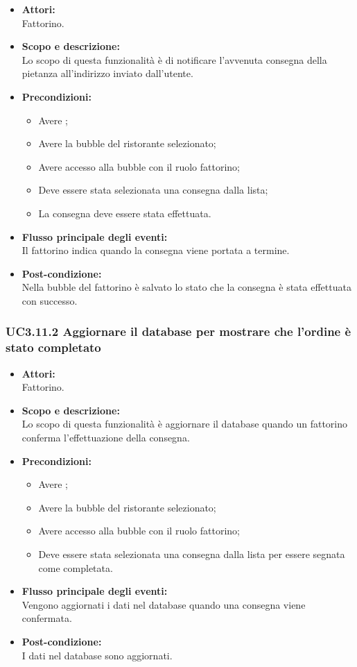 \begin{itemize}
	\item \textbf{Attori:}
	\\Fattorino.
	\item \textbf{Scopo e descrizione:} 
	\\Lo scopo di questa funzionalità è di notificare l'avvenuta consegna della pietanza all'indirizzo inviato dall'utente.
	\item \textbf{Precondizioni:}
	\begin{itemize}
		\item Avere ;
		\item Avere la bubble del ristorante selezionato;
		\item Avere accesso alla bubble con il ruolo fattorino;
		\item Deve essere stata selezionata una consegna dalla lista;
		\item La consegna deve essere stata effettuata.
	\end{itemize}
	\item \textbf{Flusso principale degli eventi:}
	\\Il fattorino indica quando la consegna viene portata a termine.
	\item \textbf{Post-condizione:}
	\\Nella bubble del fattorino è salvato lo stato che la consegna è stata effettuata con successo.
\end{itemize}

\subsubsection{UC3.11.2 Aggiornare il database per mostrare che l’ordine è stato completato} \label{UC3.11.2}

\begin{itemize}
	\item \textbf{Attori:}
	\\Fattorino.
	\item \textbf{Scopo e descrizione:} 
	\\Lo scopo di questa funzionalità è aggiornare il database quando un fattorino conferma l’effettuazione della consegna.
	\item \textbf{Precondizioni:}
	\begin{itemize}
		\item Avere ;
		\item Avere la bubble del ristorante selezionato;
		\item Avere accesso alla bubble con il ruolo fattorino;
		\item Deve essere stata selezionata una consegna dalla lista per essere segnata come completata.
	\end{itemize}
	\item \textbf{Flusso principale degli eventi:}
	\\Vengono aggiornati i dati nel database quando una consegna viene confermata.
	\item \textbf{Post-condizione:}
	\\I dati nel database sono aggiornati.
\end{itemize}

